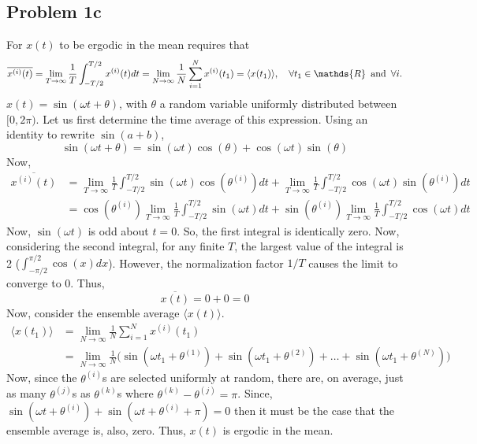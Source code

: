 \begin{homeworkProblem}
   \subsection{Problem 1c}
   For $ x(t) $ to be ergodic in the mean requires that
   \[
      \overline{x^{(i)}(t)} = \lim_{T \to \infty} \frac{1}{T}
      \int_{-T/2}^{T/2} x^{(i)}(t) dt =
      \lim_{N \to \infty} \frac{1}{N} \sum^{N}_{i=1} x^{(i)}(t_{1}) =
      \langle x(t_{1}) \rangle
      ,\quad\forall t_{1} \in \mathds{R} \enskip\text{and} \enskip\forall i.
   \]
   $ x(t) = \sin(\omega t + \theta) $, with $ \theta $ a random variable
   uniformly distributed between $ [0,2\pi) $. Let us first determine the time
   average of this expression. Using an identity to rewrite $ \sin(a+b) $,
   \[
      \sin(\omega t + \theta) = \sin(\omega t )\cos(\theta) +
      \cos(\omega t)\sin(\theta)
   \]
   Now,
   \begin{align*}
      \overline{x^{(i)}(t)} &=
      \lim_{T \to \infty} \frac{1}{T} \int_{-T/2}^{T/2} \sin(\omega t)
      \cos(\theta^{(i)}) dt +
      \lim_{T \to \infty} \frac{1}{T} \int_{-T/2}^{T/2} \cos(\omega t)
      \sin(\theta^{(i)}) dt \\
      &= \cos(\theta^{(i)})\lim_{T \to \infty} \frac{1}{T} \int_{-T/2}^{T/2}
      \sin(\omega t) dt +
      \sin(\theta^{(i)}) \lim_{T \to \infty} \frac{1}{T} \int_{-T/2}^{T/2} \cos(\omega t)
      dt
   \end{align*}
      Now, $ \sin(\omega t) $ is odd about $ t = 0 $. So, the first
      integral is identically zero. Now, considering the second integral, for
      any finite $ T $, the largest value of the
      integral is 2 ($ \int_{-\pi/2}^{\pi/2} \cos(x) dx $). However, the
      normalization factor $ 1/T $ causes the limit to converge to $ 0 $. Thus,
      \[
         \overline{x(t)} = 0 + 0 = 0
      \]
      Now, consider the ensemble average $ \langle x(t) \rangle $.
      \begin{align}
         \langle x(t_{1}) \rangle
         &= \lim_{N \to \infty} \frac{1}{N} \sum^{N}_{i=1}
         x^{(i)}(t_{1}) \\
         &= \lim_{N \to \infty} \frac{1}{N} \bigl(
         \sin(\omega t_1 + \theta^{(1)}) +
         \sin(\omega t_1 + \theta^{(2)}) +
      \ldots + \sin(\omega t_1 + \theta^{(N)}) \bigr)
      \end{align}
      Now, since the $ \theta^{(i)} $s are selected uniformly at random, there are,
      on average, just as many $ \theta^{(j)} $s as $ \theta^{(k)} $s where $
      \theta^{(k)} -
      \theta^{(j)} = \pi$. Since, $ \sin(\omega t + \theta^{(i)}) + \sin(\omega t +
      \theta^{(i)} + \pi) = 0 $ then it must be the case that the ensemble average
      is, also, zero. Thus, $ x(t) $ is ergodic in the mean.


\end{homeworkProblem}
